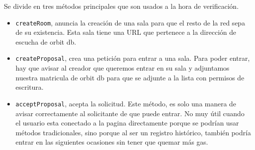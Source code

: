 Se divide en tres métodos principales que son usados a la hora de verificación.
\begin{itemize}
    \item \verb|createRoom|, anuncia la creación de una sala para que el resto de la red sepa de su existencia.
    Esta sala tiene una URL que pertenece a la dirección de escucha de orbit db.
    \item \verb|createProposal|, crea una petición para entrar a una sala.
    Para poder entrar, hay que avisar al creador que queremos entrar en su sala y adjuntamos nuestra matricula de orbit db para que se adjunte a la lista con permisos de escritura.
    \item \verb|acceptProposal|, acepta la solicitud. Este método, es solo una manera de avisar correctamente al solicitante de que puede entrar. No muy útil cuando el usuario esta conectado a la pagina directamente porque se podrían usar métodos tradicionales, sino porque al ser un registro histórico, también podría entrar en las siguientes ocasiones sin tener que quemar más gas.
\end{itemize}

